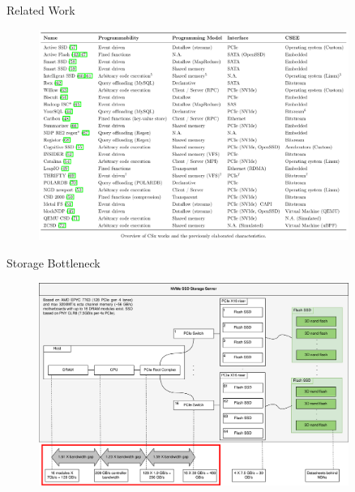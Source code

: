 \documentclass{beamer}
\begin{document}
\begin{frame}{Related Work}
	\begingroup
	\begin{figure}
		\centering
		\includegraphics[width=0.9\textwidth]{resources/images/related-work.png}
	\end{figure}
	\endgroup
\end{frame}

% 
\begin{frame}{Storage Bottleneck}
	\begingroup
	\begin{figure}
		\centering
		\includegraphics[width=0.9\textwidth]{resources/images/storage-bottleneck.png}
	\end{figure}
	\endgroup
\end{frame}
\end{document}
